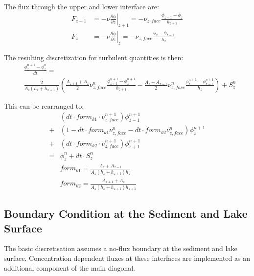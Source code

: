 \documentclass[paper=a4, fontsize=12pt]{article}
\begin{document}
\noindent The flux through the upper and lower interface are:
\begin{align}
F_{z+1} &= -\nu\left.\frac{\partial \phi}{\partial z}\right|_{z+1} = -\nu_{z,face}\frac{\phi_{z+1}-\phi_{z}}{h_{z+1}} \\
F_{z} &= -\nu\left.\frac{\partial \phi}{\partial z}\right|_{z} = -\nu_{z,face}\frac{\phi_{z}-\phi_{z-1}}{h_{z}}
\end{align}

\noindent The resulting discretization for turbulent quantities is then:
\begin{align}
&\frac{\phi^{n+1}_z-\phi^n_z}{dt} = \nonumber\\
&\frac{2}{A_z\left(h_z+h_{z+1}\right)}
\left(\frac{A_{z+1}+A_z}{2}\nu^{n}_{z,face}\frac{\phi^{n+1}_{z+1}-\phi^{n+1}_{z}}{h_{z+1}}
-\frac{A_{z}+A_{z-1}}{2}\nu^{n}_{z,face}\frac{\phi^{n+1}_{z}-\phi^{n+1}_{z-1}}{h_{z}}
\right)+S^n_z 
\end{align}

\noindent This can be rearranged to:
\begin{align}
  &\left(dt\cdot form_{k1}\cdot\nu^{n+1}_{z,face}\right)\phi^{n+1}_{z-1}\nonumber\\
  +&\left(1-dt\cdot form_{k1}\nu^{n}_{z,face}-dt\cdot form_{k2}\nu^{n}_{z,face}\right)\phi^{n+1}_z\nonumber\\
  +&\left(dt\cdot form_{k2}\cdot\nu^{n+1}_{z,face}\right)\phi^{n+1}_{z+1}\nonumber\\ 
  =& \phi^{n}_{z}+dt\cdot S^n_z\\
&form_{k1} = \frac{A_{z}+A_{z-1}}{A_z\left(h_z+h_{z+1}\right)h_z}\\
&form_{k2} = \frac{A_{z+1}+A_z}{A_z\left(h_z+h_{z+1}\right)h_{z+1}}
\end{align}


\subsection{Boundary Condition at the Sediment and Lake Surface}

The basic discretisation assumes a no-flux boundary at the sediment and lake surface. Concentration dependent fluxes at these interfaces are implemented as an additional component of the main diagonal.

\end{document}
